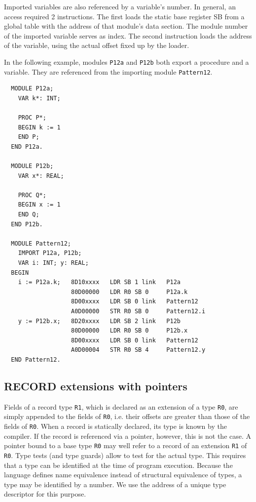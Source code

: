 Imported variables are also referenced by a variable's number. In general, an access required 2
instructions. The first loads the static base register SB from a global table with the address of that
module's data section. The module number of the imported variable serves as index. The second
instruction loads the address of the variable, using the actual offset fixed up by the loader.

In the following example, modules \verb|P12a| and \verb|P12b| both export a procedure and a variable.
They are referenced from the importing module \verb|Pattern12|.
\begin{verbatim}
  MODULE P12a;
    VAR k*: INT;
  
    PROC P*;
    BEGIN k := 1
    END P;
  END P12a.
  
  MODULE P12b;
    VAR x*: REAL;
  
    PROC Q*;
    BEGIN x := 1
    END Q;
  END P12b.
  
  MODULE Pattern12;
    IMPORT P12a, P12b;
    VAR i: INT; y: REAL;
  BEGIN
    i := P12a.k;   8D10xxxx   LDR SB 1 link   P12a
                   80D00000   LDR R0 SB 0     P12a.k
                   8D00xxxx   LDR SB 0 link   Pattern12
                   A0D00000   STR R0 SB 0     Pattern12.i
    y := P12b.x;   8D20xxxx   LDR SB 2 link   P12b
                   80D00000   LDR R0 SB 0     P12b.x
                   8D00xxxx   LDR SB 0 link   Pattern12
                   A0D00004   STR R0 SB 4     Pattern12.y
  END Pattern12.
\end{verbatim}

\subsection{RECORD extensions with pointers}
Fields of a record type \verb|R1|, which is declared as an extension of a type \verb|R0|, are simply
appended to the fields of \verb|R0|, i.e. their offsets are greater than those of the fields of
\verb|R0|. When a record is statically declared, its type is known by the compiler. If the record is
referenced via a pointer, however, this is not the case. A pointer bound to a base type \verb|R0| may
well refer to a record of an extension \verb|R1| of \verb|R0|. Type tests (and type guards) allow to
test for the actual type. This requires that a type can be identified at the time of program execution.
Because the language defines name equivalence instead of structural equivalence of types, a type may
be identified by a number. We use the address of a unique type descriptor for this purpose.

